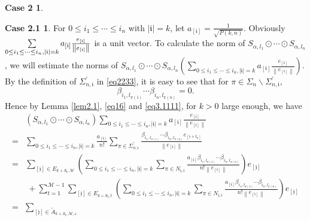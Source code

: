 \documentclass[11pt]{article}
\theoremstyle{plain}
\theoremstyle{definition}
\newtheorem*{case2}{Case 2}
\newtheorem*{case2.1}{Case 2.1}
\begin{document}
{\begin{case2}
\begin{case2.1}
For $0 \leq i_1 \leq \cdots \leq i_n$ with $|\mathfrak{i}|=k$, let $a_{[\mathfrak{i}]}=\frac{1}{\sqrt{P(k,n)} }$. Obviously $\sum\limits\limits_{0 \leq i_1 \leq \cdots \leq i_n, |\mathfrak{i}|=k} a_{[\mathfrak{i}]} \frac{ e_{[\mathfrak{i}]} }{\left \|  e_{[\mathfrak{i}]}  \right \| }$ is a unit vector.
To calculate the norm of $S_{\alpha,{l_{1}}}\odot \cdots \odot S_{\alpha,{l_{n}}}$, we will estimate the norms of $S_{\alpha,{l_{1}}}\odot \cdots \odot S_{\alpha,{l_{n}}}\left(\sum\limits_{0 \leq i_1 \leq \cdots \leq i_n, |\mathfrak{i}|=k}a_{[\mathfrak{i}]} \frac{ e_{[\mathfrak{i}]} }{\left \|  e_{[\mathfrak{i}]}  \right \| }\right)$. 
By the definition of $\Sigma_{n,\mathfrak{i}}^{\prime}$ in \eqref{eq2233}, it is easy to see that
for $\pi \in \Sigma_{n}\backslash \Sigma_{n,\mathfrak{i}}^{\prime},$  $$\beta_{i_{1},l_{\pi  (1)}} \cdots\beta_{i_{n},l_{\pi  (n)}}=0.$$ Hence by Lemma \ref{lem2.1}, \eqref{eq16} and \eqref{eq3.1111}, for $k>0$ large enough, we have
	\begin{equation}\label{eq24}
			\begin{aligned}
			&	\left ( S_{\alpha,{l_{1}}}\odot \cdots \odot S_{\alpha,{l_{n}}}  \right )
			 \sum\limits_{0 \leq i_1 \leq \cdots \leq i_n, |\mathfrak{i}|=k}a_{[\mathfrak{i}]} \frac{ e_{[\mathfrak{i}]} }{\left \|  e_{[\mathfrak{i}]}  \right \| }
\\ =& \sum\limits_{0 \leq i_1 \leq \cdots \leq i_n, |\mathfrak{i}|=k}\frac{a_{[\mathfrak{i}]}}{n!}\sum\limits_{\pi  \in \Sigma_{n,\mathfrak{i}}^{\prime} }\frac{ \beta_{i_{1},l_{\pi  (1)}} \cdots\beta_{i_{n},l_{\pi  (n)}}e_{[\mathfrak{i}+\mathfrak{l}_\pi]}}{\left \|  e_{[\mathfrak{i}] } \right \| }
			\\=& \sum\limits_{[\mathfrak{j}]\in E_{k+S_{\mathfrak{l}},\mathscr{M} }  }
			\left (\sum\limits_{0 \leq i_1 \leq \cdots \leq i_n, |\mathfrak{i}|=k}
 \sum\limits_{\pi \in N_{\mathfrak{j}, \mathfrak{i}  } }\frac{a_{[\mathfrak{i}]}		\beta_{i_{1},l_{\pi  (1)}} \cdots\beta_{i_{n},l_{\pi  (n)}}}{n!\left \| e_{[\mathfrak{i}]} \right \|} \right )
			e_{[\mathfrak{j}]}
			\\  & ~ + \sum\limits_{t=1}^{\mathscr{M}-1}\sum\limits_{ [\mathfrak{j}]\in E_{k+S_{\mathfrak{l}},t }  }
			\left ( \sum\limits_{0 \leq i_1 \leq \cdots \leq i_n, |\mathfrak{i}|=k}
 \sum\limits_{\pi \in N_{\mathfrak{j}, \mathfrak{i}  } }\frac{ a_{[\mathfrak{i}]  }		\beta_{i_{1},l_{\pi  (1)}} \cdots\beta_{i_{n},l_{\pi  (n)}}}{n!\left \|e_{[\mathfrak{i}]} \right \|} \right )
			 	e_{[\mathfrak{j}]}  
			\\ =&  \sum\limits_{[\mathfrak{j}]\in \tilde{A}_{k+S_{\mathfrak{l}},\mathscr{M},\varepsilon }}

\end{aligned}
\end{equation}
\end{case2.1}
\end{case2}}
\end{document}
